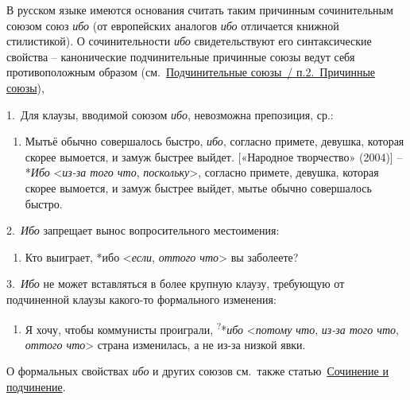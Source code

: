 В русском языке имеются основания считать таким причинным сочинительным
союзом союз \emph{ибо} (от европейских аналогов \emph{ибо} отличается
книжной стилистикой). О сочинительности \emph{ибо} свидетельствуют его
синтаксические свойства -- канонические подчинительные причинные союзы
ведут себя противоположным образом (см.~\underline{Подчинительные
союзы~/ п.2.~Причинные союзы}),

1.~Для клаузы, вводимой союзом \emph{ибо}, невозможна препозиция, ср.:

\begin{enumerate}
\def\labelenumi{(\arabic{enumi})}
\setcounter{enumi}{176}
\item
  Мытьё обычно совершалось быстро, \emph{ибо}, согласно примете,
  девушка, которая скорее вымоется, и замуж быстрее выйдет. {[}«Народное
  творчество» (2004){]} -- *\emph{Ибо} \textless{}\emph{из-за того что},
  \emph{поскольку}\textgreater, согласно примете, девушка, которая
  скорее вымоется, и замуж быстрее выйдет, мытье обычно совершалось
  быстро.
\end{enumerate}

2.~\emph{Ибо} запрещает вынос вопросительного местоимения:

\begin{enumerate}
\def\labelenumi{(\arabic{enumi})}
\setcounter{enumi}{177}
\item
  Кто выиграет, *ибо \textless{}\emph{если}, \emph{оттого
  что}\textgreater{} вы заболеете?
\end{enumerate}

3.~\emph{Ибо} не может вставляться в более крупную клаузу, требующую от
подчиненной клаузы какого-то формального изменения:

\begin{enumerate}
\def\labelenumi{(\arabic{enumi})}
\setcounter{enumi}{178}
\item
  Я хочу, чтобы коммунисты проиграли, \textsuperscript{?}*\emph{ибо}
  \textless{}\emph{потому что}, \emph{из-за того что}, \emph{оттого
  что}\textgreater{} страна изменилась, а не из-за низкой явки.
\end{enumerate}

О формальных свойствах \emph{ибо} и других союзов см.~также
статью~\underline{Сочинение и подчинение}.

